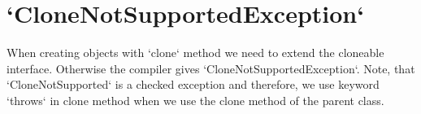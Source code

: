 \section{`CloneNotSupportedException` \label{cloneNotSupportedException}\cite{Suresh, Oracle}}
When creating objects with `clone` method we need to extend the cloneable interface. Otherwise the compiler gives `CloneNotSupportedException`. Note, that `CloneNotSupported` is a checked exception and therefore, we use keyword `throws` in clone method when we use the clone method of the parent class.
